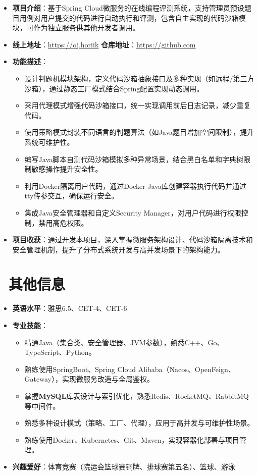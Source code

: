 \documentclass{../../styles/resume}
\begin{document}
\begin{itemize}[leftmargin=*, labelsep=0.5em]
  \item \textbf{项目介绍}：基于Spring Cloud微服务的在线编程评测系统，支持管理员预设题目用例对用户提交的代码进行自动执行和评测，包含自主实现的代码沙箱模块，可作为独立服务供其他开发者调用。
  \item \textbf{线上地址}：\url{https://oj.horiik} \quad \textbf{仓库地址}：\url{https://github.com}
  \item \textbf{功能描述}：
    \begin{itemize}
      \item 设计判题机模块架构，定义代码沙箱抽象接口及多种实现（如远程/第三方沙箱），通过静态工厂模式结合Spring配置实现动态调用。
      \item 采用代理模式增强代码沙箱接口，统一实现调用前后日志记录，减少重复代码。
      \item 使用策略模式封装不同语言的判题算法（如Java题目增加空间限制），提升系统可维护性。
      \item 编写Java脚本自测代码沙箱模拟多种异常场景，结合黑白名单和字典树限制敏感操作提升安全性。
      \item 利用Docker隔离用户代码，通过Docker Java库创建容器执行代码并通过tty传参交互，确保运行安全。
      \item 集成Java安全管理器和自定义Security Manager，对用户代码进行权限控制，禁用高危权限。
    \end{itemize}
  \item \textbf{项目收获}：通过开发本项目，深入掌握微服务架构设计、代码沙箱隔离技术和安全管理机制，提升了分布式系统开发与高并发场景下的架构能力。
\end{itemize}

\section{\faInfo\ 其他信息}
\begin{itemize}
  \item \textbf{英语水平}：雅思6.5、CET-4、CET-6
  \item \textbf{专业技能}：
    \begin{itemize}
      \item 精通Java（集合类、安全管理器、JVM参数），熟悉C++、Go、TypeScript、Python。 %
      \item 熟练使用SpringBoot、Spring Cloud Alibaba（Nacos、OpenFeign、Gateway），实现微服务改造与全局鉴权。 %
      \item 掌握\textbf{MySQL}库表设计与索引优化，熟悉Redis、RocketMQ、RabbitMQ等中间件。 %
      \item 熟悉多种设计模式（策略、工厂、代理），应用于高并发与可维护性场景。 %
      \item 熟练使用Docker、Kubernetes、Git、Maven，实现容器化部署与项目管理。 %
    \end{itemize}
    \item \textbf{兴趣爱好}：体育竞赛（院运会篮球赛铜牌、排球赛第五名）、篮球、游泳
\end{itemize}
\end{document}
